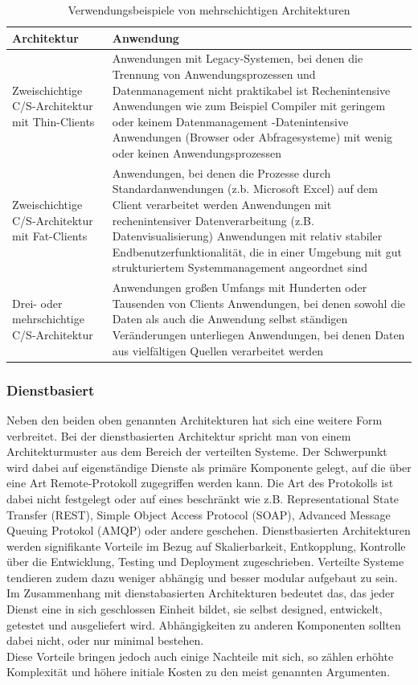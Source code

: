 	\begin{table}[h]
	\begin{tabular}{|p{3.5cm}|p{12.5cm}|}
		\hline 
		\textbf{Architektur} & \textbf{Anwendung} \\ 
		\hline 
		Zweischichtige C/S-Architektur mit Thin-Clients & Anwendungen mit Legacy-Systemen, bei denen die Trennung von Anwendungsprozessen und Datenmanagement nicht praktikabel ist Rechenintensive Anwendungen wie zum Beispiel Compiler mit geringem oder keinem Datenmanagement -Datenintensive Anwendungen (Browser oder Abfragesysteme) mit wenig oder keinen Anwendungsprozessen \\
		\hline 
		Zweischichtige C/S-Architektur mit Fat-Clients & Anwendungen, bei denen die Prozesse durch Standardanwendungen (z.b. Microsoft Excel) auf dem Client verarbeitet werden Anwendungen mit rechenintensiver Datenverarbeitung (z.B. Datenvisualisierung) Anwendungen mit relativ stabiler Endbenutzerfunktionalität, die in einer Umgebung mit gut strukturiertem Systemmanagement angeordnet sind \\ 
		\hline 
		Drei- oder mehrschichtige C/S-Architektur & Anwendungen großen Umfangs mit Hunderten oder Tausenden von Clients Anwendungen, bei denen sowohl die Daten als auch die Anwendung selbst ständigen Veränderungen unterliegen Anwendungen, bei denen Daten aus vielfältigen Quellen verarbeitet werden \\ 
		\hline 
	\end{tabular} 
			\caption{Verwendungsbeispiele von mehrschichtigen Architekturen \cite{Sommerville.2007}}
	\end{table}
	
	
	\subsubsection{Dienstbasiert}
	Neben den beiden oben genannten Architekturen hat sich eine weitere Form verbreitet. Bei der dienstbasierten Architektur spricht man von einem Architekturmuster aus dem Bereich der verteilten Systeme. Der Schwerpunkt wird dabei auf eigenständige Dienste als primäre Komponente gelegt, auf die über eine Art Remote-Protokoll zugegriffen werden kann. Die Art des Protokolls ist dabei nicht festgelegt oder auf eines beschränkt wie z.B. Representational State Transfer (REST), Simple Object Access Protocol (SOAP), Advanced Message Queuing Protokol (AMQP) oder andere geschehen.
	Dienstbasierten Architekturen werden signifikante Vorteile im Bezug auf Skalierbarkeit, Entkopplung, Kontrolle über die Entwicklung, Testing und Deployment zugeschrieben. Verteilte Systeme tendieren zudem dazu weniger abhängig und besser modular aufgebaut zu sein. Im Zusammenhang mit dienstabasierten Architekturen bedeutet das, das jeder Dienst eine in sich geschlossen Einheit bildet, sie selbst designed, entwickelt, getestet und ausgeliefert wird.  Abhängigkeiten zu anderen Komponenten sollten dabei nicht, oder nur minimal bestehen. \\
	Diese Vorteile bringen jedoch auch einige Nachteile mit sich, so zählen erhöhte Komplexität und höhere initiale Kosten zu den meist genannten Argumenten.

